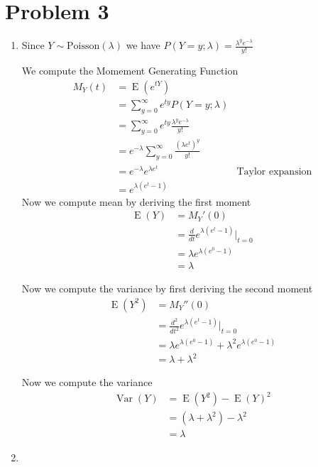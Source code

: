 \documentclass{article}
\DeclareMathOperator{\Var}{Var}
\DeclareMathOperator{\E}{E}
\begin{document}
\section*{Problem 3}
\begin{enumerate}[label=(\alph*)]
  \item

    Since \(Y \sim \text{Poisson}(\lambda)\) we have
    \(P(Y=y;\lambda) = \frac{\lambda^y e^{-\lambda}}{y!}\)

    We compute the Momement Generating Function
    \begin{align*}
      M_Y(t) &= \E(e^{tY}) \\
      &= \sum_{y=0}^{\infty} e^{ty} P(Y=y;\lambda) \\
      &= \sum_{y=0}^{\infty} e^{ty} \frac{\lambda^y e^{-\lambda}}{y!} \\
      &= e^{-\lambda} \sum_{y=0}^{\infty} \frac{(\lambda e^t)^y}{y!} \\
      &= e^{-\lambda} e^{\lambda e^t} & \text{Taylor expansion}\\
      &= e^{\lambda (e^t - 1)}
    \end{align*}
    Now we compute mean by deriving the first moment
    \begin{align*}
      \E(Y) &= M_Y'(0) \\
      &= \frac{d}{dt} e^{\lambda (e^t - 1)} \bigg|_{t=0} \\
      &= \lambda e^{\lambda (e^0 - 1)} \\
      &= \lambda
    \end{align*}

    Now we compute the variance by first deriving the second moment
    \begin{align*}
      \E(Y^2) &= M_Y''(0) \\
      &= \frac{d^2}{dt^2} e^{\lambda (e^t - 1)} \bigg|_{t=0} \\
      &= \lambda e^{\lambda (e^0 - 1)} + \lambda^2 e^{\lambda (e^0 - 1)} \\
      &= \lambda + \lambda^2
    \end{align*}

    Now we compute the variance
    \begin{align*}
      \Var(Y) &= \E(Y^2) - \E(Y)^2 \\
      &= (\lambda + \lambda^2) - \lambda^2 \\
      &= \lambda
    \end{align*}

  \item


\end{enumerate}
\end{document}
